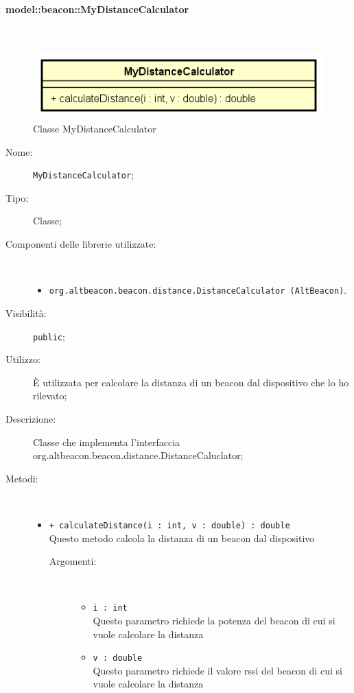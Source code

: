 \documentclass[../DefinizioneDiProdotto.tex]{subfiles}
\begin{document}
\paragraph{model::beacon::MyDistanceCalculator}
\
\begin{figure}[H]
	\centering
	\includegraphics[width=\maxwidth]{img/MyDistanceCalculator.png}
	\caption{Classe MyDistanceCalculator}\label{fig:model::beacon::MyDistanceCalculator} 
\end{figure}
\begin{description}
	\item[Nome:] \texttt{MyDistanceCalculator};
	\item[Tipo:] Classe;
	\item[Componenti delle librerie utilizzate:] \
	\begin{itemize}
		\item \texttt{org.altbeacon.beacon.distance.DistanceCalculator (AltBeacon)}.
		
	\end{itemize}
	\item[Visibilità:] \texttt{public};
	\item[Utilizzo:] È utilizzata per calcolare la distanza di un beacon dal dispositivo che lo ho rilevato;
	\item[Descrizione:] Classe che implementa l'interfaccia org.altbeacon.beacon.distance.DistanceCaluclator;
	\item[Metodi:] \
	\begin{itemize}
		\item \texttt{+ calculateDistance(i : int, v : double) : double}\\
		Questo metodo calcola la distanza di un beacon dal dispositivo
		\begin{description}
			\item[Argomenti:] \
			\begin{itemize}
				\item \texttt{i : int}\\
				Questo parametro richiede la potenza del beacon di cui si vuole calcolare la distanza\item \texttt{v : double}\\
				Questo parametro richiede il valore rssi del beacon di cui si vuole calcolare la distanza\end{itemize}
		\end{description}
	\end{itemize}
\end{description}
\end{document}
